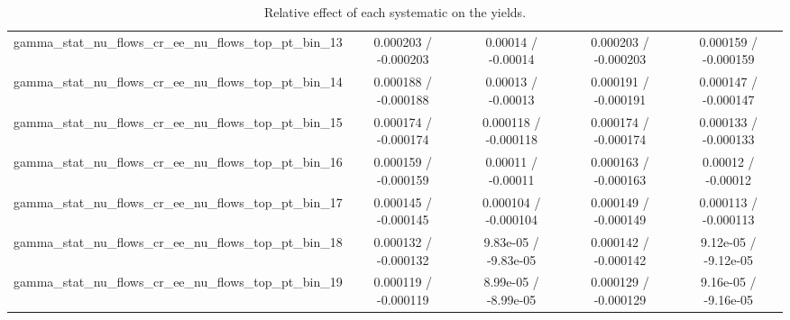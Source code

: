 \documentclass[10pt]{article}
\begin{document}
\begin{table}[htbp]
\begin{center}
\begin{tabular}{|c|c|c|c|c|}
  gamma_stat_nu_flows_cr_ee_nu_flows_top_pt_bin_13 & 0.000203 / -0.000203 & 0.00014 / -0.00014 & 0.000203 / -0.000203 & 0.000159 / -0.000159 \\ 
  gamma_stat_nu_flows_cr_ee_nu_flows_top_pt_bin_14 & 0.000188 / -0.000188 & 0.00013 / -0.00013 & 0.000191 / -0.000191 & 0.000147 / -0.000147 \\ 
  gamma_stat_nu_flows_cr_ee_nu_flows_top_pt_bin_15 & 0.000174 / -0.000174 & 0.000118 / -0.000118 & 0.000174 / -0.000174 & 0.000133 / -0.000133 \\ 
  gamma_stat_nu_flows_cr_ee_nu_flows_top_pt_bin_16 & 0.000159 / -0.000159 & 0.00011 / -0.00011 & 0.000163 / -0.000163 & 0.00012 / -0.00012 \\ 
  gamma_stat_nu_flows_cr_ee_nu_flows_top_pt_bin_17 & 0.000145 / -0.000145 & 0.000104 / -0.000104 & 0.000149 / -0.000149 & 0.000113 / -0.000113 \\ 
  gamma_stat_nu_flows_cr_ee_nu_flows_top_pt_bin_18 & 0.000132 / -0.000132 & 9.83e-05 / -9.83e-05 & 0.000142 / -0.000142 & 9.12e-05 / -9.12e-05 \\ 
  gamma_stat_nu_flows_cr_ee_nu_flows_top_pt_bin_19 & 0.000119 / -0.000119 & 8.99e-05 / -8.99e-05 & 0.000129 / -0.000129 & 9.16e-05 / -9.16e-05 \\ 
\hline 
\end{tabular} 
\caption{Relative effect of each systematic on the yields.} 
\end{center} 
\end{table} 
\end{document}
